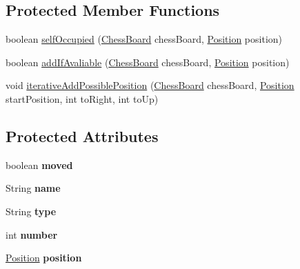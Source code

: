 \subsection*{Protected Member Functions}
\begin{DoxyCompactItemize}
\item 
boolean \hyperlink{classchess_pieces_1_1_chess_piece_a77b641798a0a706b4fa7a9ba9b2b99a7}{self\+Occupied} (\hyperlink{classmodels_1_1_chess_board}{Chess\+Board} chess\+Board, \hyperlink{classmodels_1_1_position}{Position} position)
\item 
boolean \hyperlink{classchess_pieces_1_1_chess_piece_ae2d53226500eae41edb706d492fe46ec}{add\+If\+Avaliable} (\hyperlink{classmodels_1_1_chess_board}{Chess\+Board} chess\+Board, \hyperlink{classmodels_1_1_position}{Position} position)
\item 
void \hyperlink{classchess_pieces_1_1_chess_piece_a584538d6c160d1b10c71979f30ec7c46}{iterative\+Add\+Possible\+Position} (\hyperlink{classmodels_1_1_chess_board}{Chess\+Board} chess\+Board, \hyperlink{classmodels_1_1_position}{Position} start\+Position, int to\+Right, int to\+Up)
\end{DoxyCompactItemize}
\subsection*{Protected Attributes}
\begin{DoxyCompactItemize}
\item 
\hypertarget{classchess_pieces_1_1_chess_piece_ab25ff9d258130b76fde382660d5b5e70}{boolean {\bfseries moved}}\label{classchess_pieces_1_1_chess_piece_ab25ff9d258130b76fde382660d5b5e70}

\item 
\hypertarget{classchess_pieces_1_1_chess_piece_acc623ade4ef4919bb496cd5d99a7019a}{String {\bfseries name}}\label{classchess_pieces_1_1_chess_piece_acc623ade4ef4919bb496cd5d99a7019a}

\item 
\hypertarget{classchess_pieces_1_1_chess_piece_a3de6dd510abf506fd4faabee948ea2fc}{String {\bfseries type}}\label{classchess_pieces_1_1_chess_piece_a3de6dd510abf506fd4faabee948ea2fc}

\item 
\hypertarget{classchess_pieces_1_1_chess_piece_a085d0f9d9a2fe2282ffa84cd32e2d2f4}{int {\bfseries number}}\label{classchess_pieces_1_1_chess_piece_a085d0f9d9a2fe2282ffa84cd32e2d2f4}

\item 
\hypertarget{classchess_pieces_1_1_chess_piece_ad2ab97750fa0e2df85710c953915588b}{\hyperlink{classmodels_1_1_position}{Position} {\bfseries position}}\label{classchess_pieces_1_1_chess_piece_ad2ab97750fa0e2df85710c953915588b}

\end{DoxyCompactItemize}


